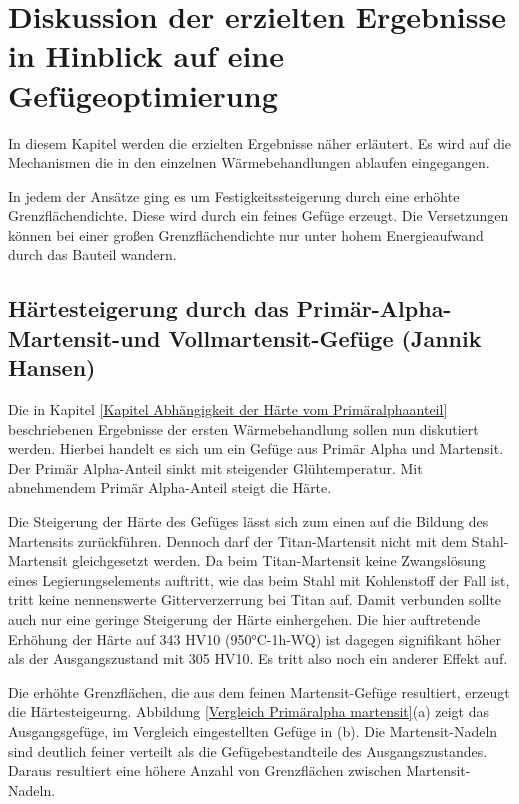 \documentclass[a4paper, 11pt]{tubsreprt}
\begin{document}
\chapter{Diskussion der erzielten Ergebnisse in Hinblick auf eine Gefügeoptimierung}
In diesem Kapitel werden die erzielten Ergebnisse näher erläutert. Es wird auf die Mechanismen die in den  einzelnen Wärmebehandlungen ablaufen eingegangen.

In jedem der Ansätze ging es um Festigkeitssteigerung durch eine erhöhte Grenzflächendichte. Diese wird durch ein feines Gefüge erzeugt. Die Versetzungen können bei einer großen Grenzflächendichte nur unter hohem Energieaufwand durch das Bauteil wandern. 
\section{Härtesteigerung durch das Primär-Alpha-Martensit-und Vollmartensit-Gefüge (Jannik Hansen)}\label{Kapitel einfluss des Primäralphaanteils}
Die in Kapitel \ref{Kapitel Abhängigkeit der Härte vom Primäralphaanteil} beschriebenen Ergebnisse der ersten Wärmebehandlung sollen nun diskutiert werden. Hierbei handelt es sich um ein Gefüge aus Primär Alpha und Martensit. Der Primär Alpha-Anteil sinkt mit steigender Glühtemperatur. Mit abnehmendem Primär Alpha-Anteil steigt die Härte.


Die Steigerung der Härte des Gefüges lässt sich zum einen auf die Bildung des Martensits zurückführen. Dennoch darf der Titan-Martensit nicht mit dem Stahl-Martensit gleichgesetzt werden. Da beim Titan-Martensit keine Zwangslösung eines Legierungselements auftritt, wie das beim Stahl mit Kohlenstoff der Fall ist, tritt keine nennenswerte Gitterverzerrung bei Titan auf. Damit verbunden sollte auch nur eine geringe Steigerung der Härte einhergehen. Die hier auftretende Erhöhung der Härte auf 343 HV10 (950°C-1h-WQ) ist dagegen signifikant höher als der Ausgangszustand mit 305 HV10. Es tritt also noch ein anderer Effekt auf.

Die erhöhte Grenzflächen, die aus dem feinen Martensit-Gefüge resultiert, erzeugt die Härtesteigeurng. Abbildung \ref{Vergleich Primäralpha martensit}(a) zeigt das Ausgangsgefüge, im Vergleich eingestellten Gefüge in (b). Die Martensit-Nadeln sind deutlich feiner verteilt als die Gefügebestandteile des Ausgangszustandes. Daraus resultiert eine höhere Anzahl von Grenzflächen zwischen Martensit-Nadeln.
\end{document}
